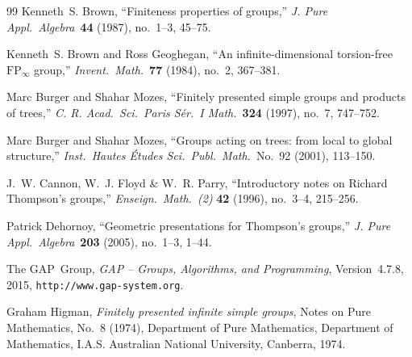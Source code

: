 \documentclass[a4paper,11pt]{article}
\numberwithin{equation}{section}
\begin{document}
\begin{thebibliography}{99}
  Kenneth~S. Brown, ``Finiteness properties of groups,''
  \textit{J. Pure Appl.\ Algebra}~\textbf{44} (1987), no.~1--3,
  45--75.

  Kenneth~S. Brown and Ross Geoghegan, ``An infinite-dimensional
  torsion-free $\mathrm{FP}_{\infty}$ group,''
  \textit{Invent.\ Math.}~\textbf{77} (1984), no.~2, 367--381.

  Marc Burger and Shahar Mozes, ``Finitely presented simple groups and
  products of trees,'' \textit{C. R. Acad.\ Sci.\ Paris S\'{e}r.~I
    Math.}~\textbf{324} (1997), no.~7, 747--752.

  Marc Burger and Shahar Mozes, ``Groups acting on trees: from local
  to global structure,'' \textit{Inst.\ Hautes \'{E}tudes
    Sci.\ Publ.\ Math.}\ No.~92 (2001), 113--150.


  J.~W. Cannon, W.~J. Floyd \& W.~R. Parry, ``Introductory notes on
  Richard Thompson's groups,'' \textit{Enseign.\ Math.~(2)}
  \textbf{42} (1996), no.~3--4, 215--256.

  Patrick Dehornoy, ``Geometric presentations for Thompson's groups,''
  \textit{J. Pure Appl.\ Algebra}~\textbf{203} (2005), no.~1--3,
  1--44.

  The GAP~Group, \emph{GAP -- Groups, Algorithms, and Programming},
    Version~4.7.8, 2015, \verb+http://www.gap-system.org+.



  Graham Higman, \textit{Finitely presented infinite simple groups},
  Notes on Pure Mathematics, No.~8 (1974), Department of Pure
  Mathematics, Department of Mathematics, I.A.S. Australian National
  University, Canberra, 1974.



\end{thebibliography}
\end{document}
